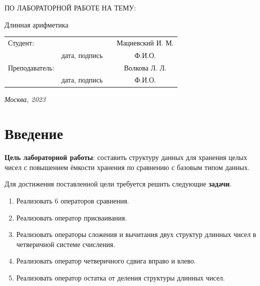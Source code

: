 \documentclass[12pt, a4paper]{article}
\begin{document}
\begin{titlepage}
\begin{center}
\begin{bf}
    \fontsize{20}{30}\selectfont
    ПО ЛАБОРАТОРНОЙ РАБОТЕ НА ТЕМУ:

    Длинная арифметика

   \end{bf}
  \end{center}

  \fontsize{14}{21}\selectfont
  \vspace{5cm}


  \noindent\begin{tabularx}{\textwidth}{ X >{\centering}p{4cm} p{1cm} c }
   Студент: & & & Мациевский И. М. \\ \cline{2-2} \cline{4-4}
   & \fontsize{10}{15}\selectfont дата, подпись & & \fontsize{10}{15}\selectfont Ф.И.О. \\
   Преподаватель: & & & Волкова Л. Л.\\ \cline{2-2} \cline{4-4}
   & \fontsize{10}{15}\selectfont дата, подпись & & \fontsize{10}{15}\selectfont Ф.И.О.
   \end{tabularx}

  \vspace{\fill}

  \begin{center}
   \it{Москва}, 2023
  \end{center}

  \thispagestyle{empty}
\end{titlepage}\newpage
\tableofcontents
\newpage
\section*{Введение}
\justifying
\textbf{Цель лабораторной работы}: составить 
структуру данных для хранения целых чисел с 
повышением ёмкости хранения по сравнению с базовым 
типом данных.

Для достижения поставленной цели требуется решить следующие 
\textbf{задачи}.
\begin{enumerate}
\item Реализовать 6 операторов сравнения.
\item Реализовать оператор присваивания.
\item Реализовать операторы сложения и вычитания 
двух структур длинных чисел в четверичной системе 
счисления.
\item Реализовать оператор четверичного сдвига 
вправо и влево.
\item Реализовать оператор остатка от деления 
структуры длинных чисел.
\end{enumerate}
\newpage
\end{document}
